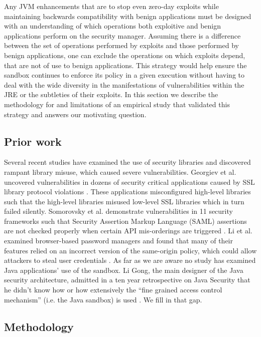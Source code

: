 \documentclass{sig-alternate}
\begin{document}
Any JVM enhancements that are to stop even zero-day exploits while maintaining backwards compatibility with benign applications must be designed with an understanding of which operations both exploitive
and benign applications perform on the security manager. Assuming
there is a difference between the set of operations performed by exploits
and those performed by benign applications, one can exclude the operations
on which exploits depend, that are not of use to benign applications. This strategy would help ensure the sandbox
continues to enforce its policy in a given execution without having
to deal with the wide diversity in the manifestations of vulnerabilities
within the JRE or the subtleties of their exploits. In this section
we describe the methodology for and limitations of an empirical study
that validated this strategy and answers our motivating question.


\subsection{Prior work}

Several recent studies have examined the use of security libraries
and discovered rampant library misuse, which caused severe vulnerabilities.
Georgiev et al. uncovered vulnerabilities in dozens of security critical
applications caused by SSL library protocol violations \cite{georgiev12most-dangerous}.
These applications misconfigured high-level libraries such that the
high-level libraries misused low-level SSL libraries which in turn
failed silently. Somorovsky et al. demonstrate vulnerabilities in
11 security frameworks such that Security Assertion Markup Language
(SAML) assertions are not checked properly when certain API mis-orderings
are triggered \cite{somorovsky12breaking}. Li et al. examined browser-based
password managers and found that many of their features relied on
an incorrect version of the same-origin policy, which could allow
attackers to steal user credentials \cite{li2014emperor}. As far
as we are aware no study has examined Java applications' use of the
sandbox. Li Gong, the main designer of the Java security architecture,
admitted in a ten year retrospective on Java Security that he didn't
know how or how extensively the ``fine grained access control mechanism''
(i.e. the Java sandbox) is used \cite{gong2009java}. We fill in that
gap. 


\subsection{Methodology}
\end{document}
